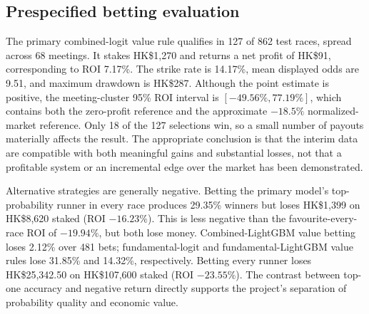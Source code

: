 \subsection{Prespecified betting evaluation}\label{sec:results-betting}
The primary combined-logit value rule qualifies in 127 of 862 test races, spread across 68 meetings. It stakes HK\$1,270 and returns a net profit of HK\$91, corresponding to ROI 7.17\%. The strike rate is 14.17\%, mean displayed odds are 9.51, and maximum drawdown is HK\$287. Although the point estimate is positive, the meeting-cluster 95\% ROI interval is $[-49.56\%,77.19\%]$, which contains both the zero-profit reference and the approximate $-18.5\%$ normalized-market reference. Only 18 of the 127 selections win, so a small number of payouts materially affects the result. The appropriate conclusion is that the interim data are compatible with both meaningful gains and substantial losses, not that a profitable system or an incremental edge over the market has been demonstrated.

Alternative strategies are generally negative. Betting the primary model's top-probability runner in every race produces 29.35\% winners but loses HK\$1,399 on HK\$8,620 staked (ROI $-16.23\%$). This is less negative than the favourite-every-race ROI of $-19.94\%$, but both lose money. Combined-LightGBM value betting loses 2.12\% over 481 bets; fundamental-logit and fundamental-LightGBM value rules lose 31.85\% and 14.32\%, respectively. Betting every runner loses HK\$25,342.50 on HK\$107,600 staked (ROI $-23.55\%$). The contrast between top-one accuracy and negative return directly supports the project's separation of probability quality and economic value.

